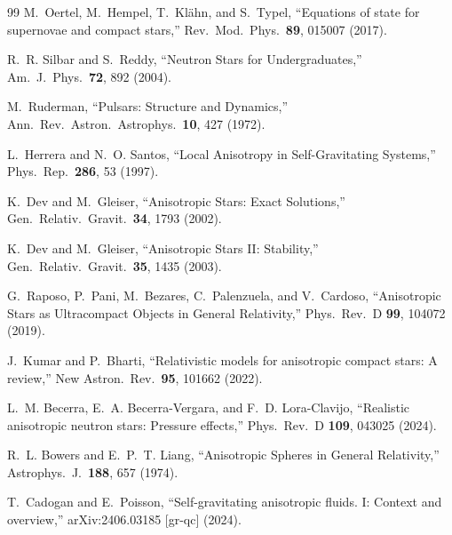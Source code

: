 \documentclass[
  aps,
  prd,
  twocolumn,
  nofootinbib,
  superscriptaddress,
  longbibliography
]{revtex4-2}
\begin{document}
\begin{thebibliography}{99}
M.~Oertel, M.~Hempel, T.~Kl\"{a}hn, and S.~Typel,
``Equations of state for supernovae and compact stars,''
Rev.\ Mod.\ Phys.\ \textbf{89}, 015007 (2017).

R.~R. Silbar and S.~Reddy,
``Neutron Stars for Undergraduates,''
Am.\ J.\ Phys.\ \textbf{72}, 892 (2004).

M.~Ruderman,
``Pulsars: Structure and Dynamics,''
Ann.\ Rev.\ Astron.\ Astrophys.\ \textbf{10}, 427 (1972).

L.~Herrera and N.~O. Santos,
``Local Anisotropy in Self-Gravitating Systems,''
Phys.\ Rep.\ \textbf{286}, 53 (1997).

K.~Dev and M.~Gleiser,
``Anisotropic Stars: Exact Solutions,''
Gen.\ Relativ.\ Gravit.\ \textbf{34}, 1793 (2002).

K.~Dev and M.~Gleiser,
``Anisotropic Stars II: Stability,''
Gen.\ Relativ.\ Gravit.\ \textbf{35}, 1435 (2003).

G.~Raposo, P.~Pani, M.~Bezares, C.~Palenzuela, and V.~Cardoso,
``Anisotropic Stars as Ultracompact Objects in General Relativity,''
Phys.\ Rev.\ D \textbf{99}, 104072 (2019).

J.~Kumar and P.~Bharti,
``Relativistic models for anisotropic compact stars: A review,''
New Astron.\ Rev.\ \textbf{95}, 101662 (2022).

L.~M. Becerra, E.~A. Becerra-Vergara, and F.~D. Lora-Clavijo,
``Realistic anisotropic neutron stars: Pressure effects,''
Phys.\ Rev.\ D \textbf{109}, 043025 (2024).

R.~L. Bowers and E.~P.~T. Liang,
``Anisotropic Spheres in General Relativity,''
Astrophys.\ J.\ \textbf{188}, 657 (1974).

T.~Cadogan and E.~Poisson,
``Self-gravitating anisotropic fluids. I: Context and overview,''
arXiv:2406.03185 [gr-qc] (2024).

\end{thebibliography}
\end{document}
